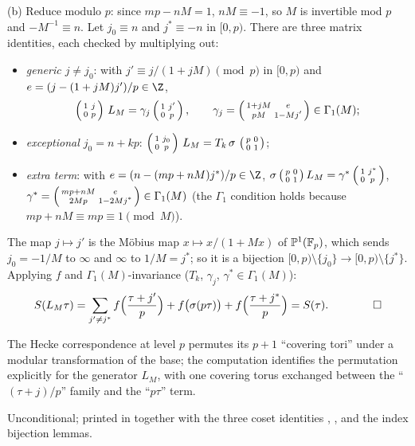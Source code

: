 (b) Reduce modulo $p$: since $mp-nM=1$, $nM\equiv-1$, so $M$ is invertible mod $p$ and $-M^{-1}\equiv n$.  Let
$j_0\equiv n$ and $j^*\equiv-n$ in $[0,p)$.  There are three matrix identities, each checked by multiplying out:
\begin{itemize}
\item \emph{generic $j\ne j_0$}: with $j'\equiv j/(1+jM)\pmod p$ in $[0,p)$ and $e=(j-(1+jM)j')/p\in\Z$,
  \begin{equation*}
    \left(\begin{smallmatrix}1&j\\0&p\end{smallmatrix}\right)\,L_M=\gamma_j\left(\begin{smallmatrix}1&j'\\0&p\end{smallmatrix}\right),\qquad \gamma_j=\left(\begin{smallmatrix}1+jM&e\\pM&1-Mj'\end{smallmatrix}\right)\in\Gamma_1(M);
  \end{equation*}
\item \emph{exceptional $j_0=n+kp$}: $\left(\begin{smallmatrix}1&j_0\\0&p\end{smallmatrix}\right)\,L_M=T_k\,\sigma\,\left(\begin{smallmatrix}p&0\\0&1\end{smallmatrix}\right)$;
\item \emph{extra term}: with $e=(n-(mp+nM)j^*)/p\in\Z$,
  $\sigma\left(\begin{smallmatrix}p&0\\0&1\end{smallmatrix}\right)L_M=\gamma^*\left(\begin{smallmatrix}1&j^*\\0&p\end{smallmatrix}\right)$, $\gamma^*=\left(\begin{smallmatrix}mp+nM&e\\2Mp&1-2Mj^*\end{smallmatrix}\right)\in\Gamma_1(M)$
  (the $\Gamma_1$ condition holds because $mp+nM\equiv mp\equiv1\pmod M$).
\end{itemize}
The map $j\mapsto j'$ is the M\"obius map $x\mapsto x/(1+Mx)$ of $\mathbb{P}^1(\mathbb F_p)$, which sends $j_0=-1/M$ to
$\infty$ and $\infty$ to $1/M=j^*$; so it is a bijection $[0,p)\setminus\{j_0\}\to[0,p)\setminus\{j^*\}$.  Applying
$f$ and $\Gamma_1(M)$-invariance ($T_k$, $\gamma_j$, $\gamma^*\in\Gamma_1(M)$):
\begin{equation*}
  S(L_M\tau)=\sum_{j'\ne j^*}f\Bigl(\frac{\tau+j'}p\Bigr)+f\bigl(\sigma(p\tau)\bigr)+f\Bigl(\frac{\tau+j^*}p\Bigr)=S(\tau).
  \qquad\qed
\end{equation*}
\begin{physics}
The Hecke correspondence at level $p$ permutes its $p+1$ ``covering tori'' under a modular transformation of the base;
the computation identifies the permutation explicitly for the generator $L_M$, with one covering torus exchanged
between the ``$(\tau+j)/p$'' family and the ``$p\tau$'' term.
\end{physics}
\begin{status}
Unconditional; printed in  together with the three coset
identities , ,  and the
index bijection lemmas.
\end{status}

